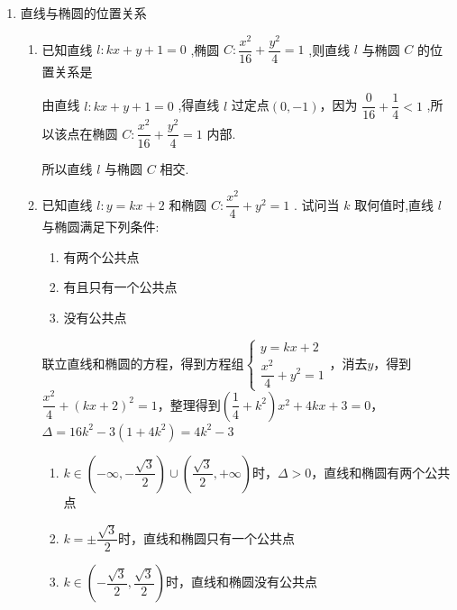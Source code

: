 \begin{enumerate}
\begin{enumerate}
\begin{jieda}
            问题转化为已知椭圆存在一个长为$5$的焦半径，一个长为$1$的焦半径，根据焦半径公式$5 = a + ex_0$可知当取到长轴顶点时可使$e$取最小，此时$c = 2$，$b = \sqrt{5}$，$S = 3\sqrt{5}\pi$.
        \end{jieda}
    \end{enumerate}
    
    \item 直线与椭圆的位置关系
    \begin{enumerate}
        \item 已知直线 $l : {kx} + y + 1 = 0$ ,椭圆 $C : \dfrac{{x}^{2}}{16} + \dfrac{{y}^{2}}{4} = 1$ ,则直线 $l$ 与椭圆 $C$ 的位置关系是 
        \begin{jieda}
            由直线 $l : {kx} + y + 1 = 0$ ,得直线 $l$ 过定点$(0, -1)$，因为 $\dfrac{0}{16} + \dfrac{1}{4} < 1$ ,所以该点在椭圆 $C : \dfrac{{x}^{2}}{16} + \dfrac{{y}^{2}}{4} = 1$ 内部.
            
            所以直线 $l$ 与椭圆 $C$ 相交.
        \end{jieda}        
        
        \item 已知直线 $l : y = {kx} + 2$ 和椭圆 $C : \dfrac{{x}^{2}}{4} + {y}^{2} = 1$ . 试问当 $k$ 取何值时,直线 $l$ 与椭圆满足下列条件:
        \begin{enumerate}
            \item 有两个公共点
            \item 有且只有一个公共点
            \item 没有公共点
        \end{enumerate}
        \begin{jieda}
            联立直线和椭圆的方程，得到方程组$\left\{\begin{array}{l}
                 y = kx + 2 \\
                 \dfrac{x^2}{4} + y^2 = 1
            \end{array}\right.$，消去$y$，得到$\dfrac{x^2}{4} + (kx+2)^2 = 1$，整理得到$\left(\dfrac{1}{4}+k^2\right)x^2+4kx+3 = 0$，$\Delta = 16k^2 - 3(1+4k^2) = 4k^2 - 3$
            \begin{enumerate}
                \item $k \in \left(-\infty, -\dfrac{\sqrt{3}}{2}\right) \cup \left(\dfrac{\sqrt{3}}{2}, +\infty\right)$时，$\Delta > 0$，直线和椭圆有两个公共点
                \item $k = \pm \dfrac{\sqrt{3}}{2}$时，直线和椭圆只有一个公共点
                \item $k \in \left(-\dfrac{\sqrt{3}}{2}, \dfrac{\sqrt{3}}{2}\right)$时，直线和椭圆没有公共点
            \end{enumerate}
        \end{jieda}


\end{enumerate}
\end{enumerate}

